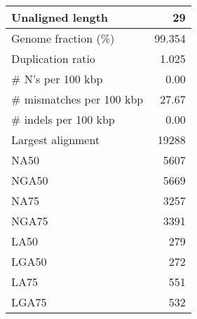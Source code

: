 \documentclass[12pt,a4paper]{article}
\begin{document}
\begin{table}[ht]
\begin{center}
\begin{tabular}{|l*{1}{|r}|}
Unaligned length & 29 \\ \hline
Genome fraction (\%) & 99.354 \\ \hline
Duplication ratio & 1.025 \\ \hline
\# N's per 100 kbp & 0.00 \\ \hline
\# mismatches per 100 kbp & 27.67 \\ \hline
\# indels per 100 kbp & 0.00 \\ \hline
Largest alignment & 19288 \\ \hline
NA50 & 5607 \\ \hline
NGA50 & 5669 \\ \hline
NA75 & 3257 \\ \hline
NGA75 & 3391 \\ \hline
LA50 & 279 \\ \hline
LGA50 & 272 \\ \hline
LA75 & 551 \\ \hline
LGA75 & 532 \\ \hline
\end{tabular}
\end{center}
\end{table}
\end{document}
